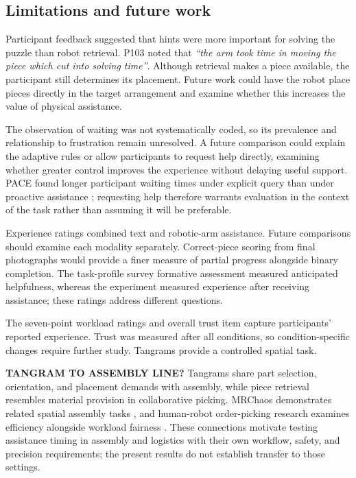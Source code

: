 \documentclass[sigconf,anonymous,balance=false]{aamas}
\providecommand{\DIFadd}[1]{{\protect\color{blue} \sf #1}} %
\providecommand{\DIFdel}[1]{{\protect\color{red} \scriptsize #1}} %
\providecommand{\DIFaddbegin}{} %
\providecommand{\DIFaddend}{} %
\providecommand{\DIFdelbegin}{} %
\providecommand{\DIFdelend}{} %
\begin{document}
\subsection{Limitations and future work}

Participant feedback suggested that hints were more important for solving the puzzle than robot retrieval. P103 noted that \textit{``the arm took time in moving the piece which cut into solving time''}. Although retrieval makes a piece available, the participant still determines its placement. Future work could have the robot place pieces directly in the target arrangement and examine whether this increases the value of physical assistance.

\DIFaddbegin \DIFadd{The observation of waiting was not systematically coded, so its prevalence and relationship to frustration remain unresolved. A future comparison could explain the adaptive rules or allow participants to request help directly, examining whether greater control improves the experience without delaying useful support. PACE found longer participant waiting times under explicit query than under proactive assistance \cite{delazzari2025}; requesting help therefore warrants evaluation in the context of the task rather than assuming it will be preferable.
}

\DIFaddend Experience ratings combined text and robotic-arm assistance. Future comparisons should examine each modality separately. Correct-piece scoring from final photographs would provide a finer measure of partial progress alongside binary completion. The \DIFdelbegin \DIFdel{task-profile survey }\DIFdelend \DIFaddbegin \DIFadd{formative assessment }\DIFaddend measured anticipated helpfulness, whereas the experiment measured experience after receiving assistance; these ratings address different questions.

The seven-point workload ratings and overall trust item capture participants' reported experience. Trust was measured after all conditions, so condition-specific changes require further study. Tangrams provide a controlled spatial task.

\DIFdelbegin \DIFdel{\textbf{TANGRAM TO ASSEMBLY LINE?}
}\DIFdelend \DIFaddbegin \DIFadd{Tangrams share part selection, orientation, and placement demands with assembly, while piece retrieval resembles material provision in collaborative picking. MRChaos demonstrates related spatial assembly tasks \cite{zhao2025}, and human-robot order-picking research examines efficiency alongside workload fairness \cite{smit2024}. These connections motivate testing assistance timing in assembly and logistics with their own workflow, safety, and precision requirements; the present results do not establish transfer to those settings.
}\DIFaddend 
\end{document}
